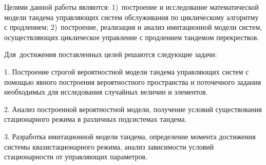 


{\aim} Целями данной работы являются: 1)~построение и исследование математической модели тандема управляющих систем обслуживания по циклическому алгоритму с продлением; 2)~построение, реализация и анализ имитационной модели систем, осуществляющих циклическое управление с продлением тандемом перекрестков.

Для~достижения поставленных целей решаются следующие задачи:

1. Построение строгой вероятностной модели тандема управляющих систем с помощью явного построения вероятностного пространства и поточечного задания необходимых для исследования случайных величин и элементов.

2. Анализ построенной вероятностной модели, получение условий существования стационарного режима в различных подсистемах тандема.

3. Разработка имитационной модели тандема, определение момента достижения системы квазистационарного режима, анализ зависимости условий стационарности от управляющих параметров.








